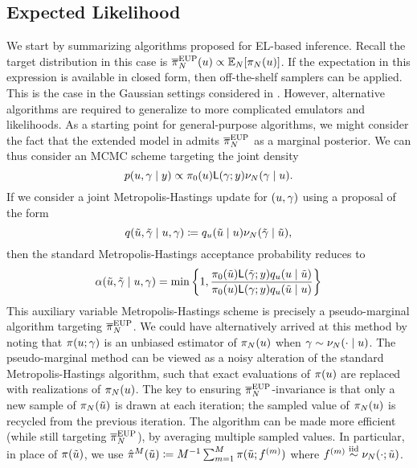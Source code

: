 \documentclass[12pt]{article}
\begin{document}
\subsection{Expected Likelihood}
We start by summarizing algorithms proposed for EL-based inference. Recall the target distribution in this 
case is $\overline{\pi}_{N}^{\mathrm{EUP}}(u) \propto \mathbb{E}_{N}[\pi_{N}(u)]$. If the expectation in this 
expression is available in closed form, then off-the-shelf samplers can be applied. This is the case in the 
Gaussian settings considered in . However, alternative 
algorithms are required to generalize to more complicated emulators and likelihoods. 
As a starting point for general-purpose algorithms, we might consider the fact that the extended model 
in  admits $\overline{\pi}_{N}^{\mathrm{EUP}}$ as a marginal posterior. We can thus 
consider an MCMC scheme targeting the joint density
\begin{equation}
p(u, \gamma \mid y) \propto \pi_0(u) \mathsf{L}(\gamma; y) \nu_{N}(\gamma \mid u). 
\end{equation}
If we consider a joint Metropolis-Hastings update for $(u, \gamma)$ using a proposal of the form
\begin{equation}
q(\tilde{u}, \tilde{\gamma} \mid u, \gamma)
\coloneqq q_{u}(\tilde{u} \mid u) \nu_{N}(\tilde{\gamma} \mid \tilde{u}),
\end{equation}
then the standard Metropolis-Hastings acceptance probability reduces to
\begin{equation}
\alpha(\tilde{u}, \tilde{\gamma} \mid u, \gamma)
= \min\left\{1, \frac{\pi_0(\tilde{u}) \mathsf{L}(\tilde{\gamma}; y)q_{u}(u \mid \tilde{u})}{\pi_0(u)\mathsf{L}(\gamma; y)q_{u}(\tilde{u} \mid u)} \right\}
\end{equation}
This auxiliary variable Metropolis-Hastings scheme is precisely a pseudo-marginal algorithm 
targeting $\overline{\pi}_{N}^{\mathrm{EUP}}$.
We could have alternatively arrived at this method by noting that $\pi(u; \gamma)$ is an unbiased 
estimator of $\pi_{N}(u)$ when $\gamma \sim \nu_{N}(\cdot \mid u)$. The pseudo-marginal method
can be viewed as a noisy alteration of the standard Metropolis-Hastings algorithm, such that exact evaluations 
of $\pi(u)$ are replaced with realizations of $\pi_{N}(u)$. The key to ensuring 
$\overline{\pi}_{N}^{\mathrm{EUP}}$-invariance is that 
only a new sample of $\pi_{N}(\tilde{u})$ is drawn at each iteration; 
the sampled value of $\pi_{N}(u)$ is recycled from the previous iteration. The algorithm can be made more 
efficient (while still targeting $\overline{\pi}_{N}^{\mathrm{EUP}}$), by averaging multiple sampled values. In particular, in place
of $\pi(\tilde{u})$, we use 
$\hat{\pi}^M(\tilde{u}) \coloneqq M^{-1} \sum_{m=1}^{M} \pi(\tilde{u}; f^{(m)})$ where 
$f^{(m)} \overset{\mathrm{iid}}{\sim} \nu_{N}(\cdot; \tilde{u})$.
\end{document}
